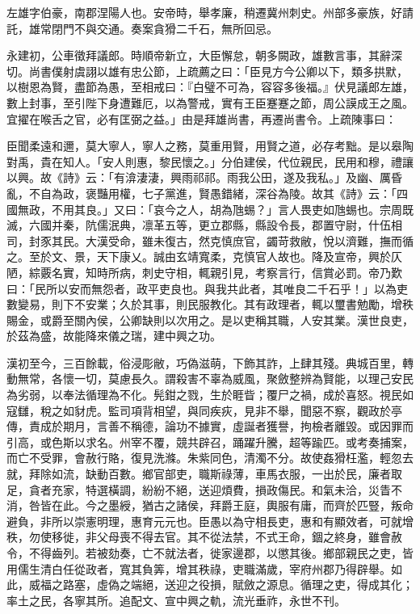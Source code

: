 
\begin{pinyinscope}
左雄字伯豪，南郡涅陽人也。安帝時，舉孝廉，稍遷冀州刺史。州部多豪族，好請託，雄常閉門不與交通。奏案貪猾二千石，無所回忌。

永建初，公車徵拜議郎。時順帝新立，大臣懈怠，朝多闕政，雄數言事，其辭深切。尚書僕射虞詡以雄有忠公節，上疏薦之曰：「臣見方今公卿以下，類多拱默，以樹恩為賢，盡節為愚，至相戒曰：『白璧不可為，容容多後福。』伏見議郎左雄，數上封事，至引陛下身遭難厄，以為警戒，實有王臣蹇蹇之節，周公謨成王之風。宜擢在喉舌之官，必有匡弼之益。」由是拜雄尚書，再遷尚書令。上疏陳事曰：

臣聞柔遠和邇，莫大寧人，寧人之務，莫重用賢，用賢之道，必存考黜。是以皋陶對禹，貴在知人。「安人則惠，黎民懷之。」分伯建侯，代位親民，民用和穆，禮讓以興。故《詩》云：「有渰淒淒，興雨祁祁。雨我公田，遂及我私。」及幽、厲昏亂，不自為政，褒豔用權，七子黨進，賢愚錯緒，深谷為陵。故其《詩》云：「四國無政，不用其良。」又曰：「哀今之人，胡為虺蜴？」言人畏吏如虺蜴也。宗周既滅，六國并秦，阬儒泯典，凛革五等，更立郡縣，縣設令長，郡置守尉，什伍相司，封豕其民。大漢受命，雖未復古，然克慎庶官，蠲苛救敝，悅以濟難，撫而循之。至於文、景，天下康乂。誠由玄靖寬柔，克慎官人故也。降及宣帝，興於仄陋，綜覈名實，知時所病，刺史守相，輒親引見，考察言行，信賞必罰。帝乃歎曰：「民所以安而無怨者，政平吏良也。與我共此者，其唯良二千石乎！」以為吏數變易，則下不安業；久於其事，則民服教化。其有政理者，輒以璽書勉勵，增秩賜金，或爵至關內侯，公卿缺則以次用之。是以吏稱其職，人安其業。漢世良吏，於茲為盛，故能降來儀之瑞，建中興之功。

漢初至今，三百餘載，俗浸彫敝，巧偽滋萌，下飾其詐，上肆其殘。典城百里，轉動無常，各懷一切，莫慮長久。謂殺害不辜為威風，聚斂整辨為賢能，以理己安民為劣弱，以奉法循理為不化。髡鉗之戮，生於睚眥；覆尸之禍，成於喜怒。視民如寇讎，稅之如豺虎。監司項背相望，與同疾疢，見非不舉，聞惡不察，觀政於亭傳，責成於期月，言善不稱德，論功不據實，虛誕者獲譽，拘檢者離毀。或因罪而引高，或色斯以求名。州宰不覆，競共辟召，踊躍升騰，超等踰匹。或考奏捕案，而亡不受罪，會赦行賂，復見洗滌。朱紫同色，清濁不分。故使姦猾枉濫，輕忽去就，拜除如流，缺動百數。鄉官部吏，職斯祿薄，車馬衣服，一出於民，廉者取足，貪者充家，特選橫調，紛紛不絕，送迎煩費，損政傷民。和氣未洽，災眚不消，咎皆在此。今之墨綬，猶古之諸侯，拜爵王庭，輿服有庸，而齊於匹豎，叛命避負，非所以崇憲明理，惠育元元也。臣愚以為守相長吏，惠和有顯效者，可就增秩，勿使移徙，非父母喪不得去官。其不從法禁，不式王命，錮之終身，雖會赦令，不得齒列。若被劾奏，亡不就法者，徙家邊郡，以懲其後。鄉部親民之吏，皆用儒生清白任從政者，寬其負筭，增其秩祿，吏職滿歲，宰府州郡乃得辟舉。如此，威福之路塞，虛偽之端絕，送迎之役損，賦斂之源息。循理之吏，得成其化；率土之民，各寧其所。追配文、宣中興之軌，流光垂祚，永世不刊。


\end{pinyinscope}
